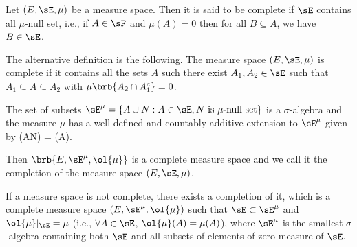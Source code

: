 \begin{definition}\label{def:complete_measure_space}%
Let $(E,\sE,\mu)$ be a measure space. Then it is said to be complete if $\sE$ contains all $\mu$-null set, i.e., if $A\in \sF$ and $\mu(A)=0$ then for all $B\subseteq A$, we have $B\in \sE$.
\end{definition}%

\begin{remark}
The alternative definition is the following. The measure space $(E,\sE,\mu)$ is complete if it contains all the sets $A$ such there exist $A_1,A_2\in \sE$ such that $A_1\subseteq A \subseteq A_2$ with $\mu\brb{A_2\cap A_1^c} = 0$.
\end{remark}

\begin{theorem}\label{thm:completion_of_measure}%
The set of subsets $\sE^\mu = \{A\cup N: A\in \sE, N \text{ is $\mu$-null set}\}$ is a $\sigma$-algebra and the measure $\mu$ has a well-defined and countably additive extension to $\sE^\mu$ given by
\be
\ol{\mu}(A\cup N) = \mu(A).
\ee %

Then $\brb{E,\sE^\mu,\ol{\mu}}$ is a complete measure space and we call it the completion of the measure space $(E,\sE,\mu)$. %
\end{theorem}

\begin{remark}
If a measure space is not complete, there exists a completion of it, which is a complete measure space $(E,\sE^\mu,\ol{\mu})$ such that $\sE \subset\sE^\mu$ and $ \ol{\mu}|_\sE = \mu$ (i.e., $\forall A\in \sE$, $\ol{\mu}(A) = \mu (A)$), where $\sE^\mu$ is the smallest $\sigma$-algebra containing both $\sE$ and all subsets of elements of zero measure of $\sE$.
\end{remark}


